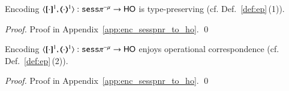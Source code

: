 \begin{proposition}\rm
	Encoding $\encod{\cdot}{\cdot}{1}: \sespnr \to \HO$  is type-preserving (cf. Def.~\ref{def:ep}\,(1)).\rm
\end{proposition}

\begin{proof}
	Proof in Appendix~\ref{app:enc_sesspnr_to_ho}.
	\qed
\end{proof}

\begin{proposition}\rm
	Encoding $\encod{\cdot}{\cdot}{1}: \sespnr \to \HO$  enjoys operational correspondence (cf. Def.~\ref{def:ep}\,(2)).
\end{proposition}


\begin{proof}
	Proof in Appendix~\ref{app:enc_sesspnr_to_ho}.
	\qed
\end{proof}

\begin{comment}
\begin{proof}[Sketch]
	We must show completeness and soundness properties. 
	For completeness, it suffices to consider source process
	$P_0 = \bout{k}{k'} P \Par \binp{k}{x} Q$. We have that
%
	\[
		P_0 \red P \Par Q\subst{k'}{x}.
	\]
%
	By the definition of encoding we have:
	\begin{eqnarray*}
		\pmap{P_0}{1} & = & \bbout{k}{ \abs{z}{\,\binp{z}{X} \appl{X}{k'}} } \pmap{P}{1} \Par \binp{k}{X} \newsp{s}{\appl{X}{s} \Par \bbout{\dual{s}}{\abs{x} \pmap{Q}{1}} \inact}  \\
		& \red & \pmap{P}{1} \Par \newsp{s}{\appl{X}{s} \subst{\abs{z}{\,\binp{z}{X} \appl{X}{k'}}}{X} \Par \bbout{\dual{s}}{\abs{x} \pmap{Q}{1}} \inact} \\
		& = & \pmap{P}{1} \Par \newsp{s}{\,\binp{s}{X} \appl{X}{k'} \Par \bbout{\dual{s}}{\abs{x} \pmap{Q}{1}} \inact} \\
		& \red & \pmap{P}{1} \Par \appl{X}{k'} \subst{\abs{x} \pmap{Q}{1}}{X} \Par \inact \\
		& \scong & \pmap{P}{1} \Par \pmap{Q}{1}\subst{k'}{x}  
	\end{eqnarray*}
	For soundness, it suffices to notice that the encoding does not add new visible actions:
	the additional synchronizations induced by the encoding always occur on private (fresh) names.
	We assume weak bisimilarities, which abstract from internal actions used by the encoding,
	and so  constructing a relation witnessing behavioral equivalence is easy.
	\qed
\end{proof}
\end{comment}

